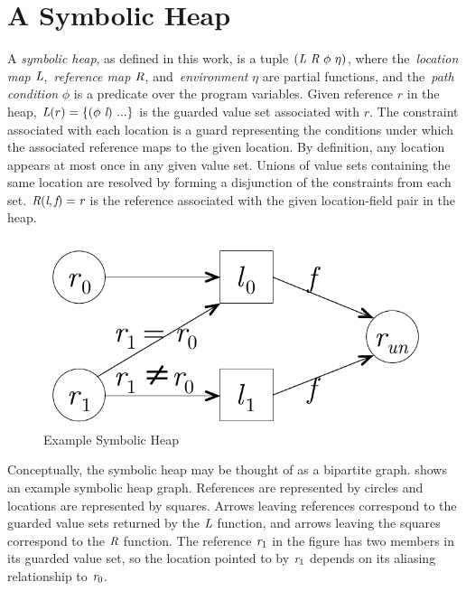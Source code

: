 \section{A Symbolic Heap}
A \emph{symbolic heap}, as defined in this work, is a tuple
$(\emph{L}\ \emph{R}\ \phi\ \eta)$, where the~\emph{location map}
$\emph{L}$,~\emph{reference map} $\emph{R}$, and~\emph{environment}
$\eta$ are partial functions, and the~\emph{path condition} $\phi$ is
a predicate over the program variables. Given reference $r$ in the heap,
$\cfgnt{L}(r) = \{(\phi\ \cfgnt{l})\ ...\}$ is the guarded value set
associated with $r$. The constraint associated with each
location is a guard representing the conditions under which the
associated reference maps to the given location. By definition, any
location appears at most once in any given value set. Unions of value
sets containing the same location are resolved by forming a
disjunction of the constraints from each set. $\emph{R}(\emph{l},
\emph{f}) = \emph{r}$ is the reference associated with the given
location-field pair in the heap. 

\begin{figure}[t]
\begin{center}
\includegraphics[scale=0.5]{../figs/simple_heap_scratch.pdf}
\end{center}
\caption{Example Symbolic Heap}
\label{fig:exampleHeap}
\end{figure}

Conceptually, the symbolic heap may be thought of as a bipartite
graph.  shows an example symbolic heap
graph. References are represented by circles and locations are
represented by squares. Arrows leaving references correspond to the
guarded value sets returned by the $\emph{L}$ function, and arrows
leaving the squares correspond to the $\emph{R}$ function. The
reference $\emph{r}_1$ in the figure has two members in its guarded value set,
so the location pointed to by $\emph{r}_1$ depends on its aliasing
relationship to $\emph{r}_0$.

